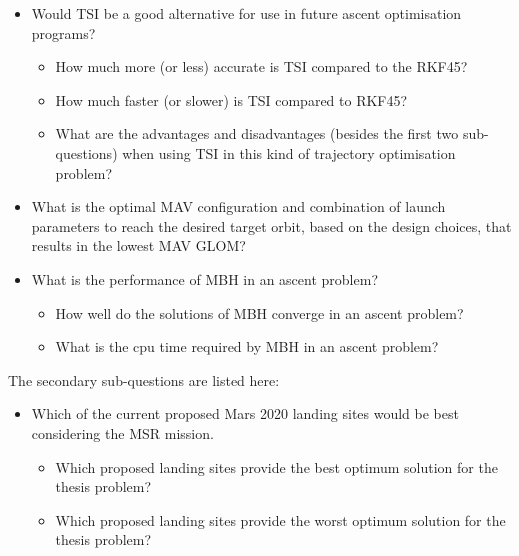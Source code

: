 \begin{itemize}
\item Would \ac{TSI} be a good alternative for use in future ascent optimisation programs?
\begin{itemize}
\item How much more (or less) accurate is \ac{TSI} compared to the \ac{RKF45}?
\item How much faster (or slower) is \ac{TSI} compared to \ac{RKF45}?
\item What are the advantages and disadvantages (besides the first two sub-questions) when using \ac{TSI} in this kind of trajectory optimisation problem?
\end{itemize}
\item What is the optimal \ac{MAV} configuration and combination of launch parameters to reach the desired target orbit, based on the design choices, that results in the lowest \ac{MAV} \ac{GLOM}?
\item What is the performance of \ac{MBH} in an ascent problem?
\begin{itemize}
\item How well do the solutions of \ac{MBH} converge in an ascent problem?
\item What is the cpu time required by \ac{MBH} in an ascent problem?
\end{itemize}
\end{itemize}

The secondary sub-questions are listed here:

\begin{itemize}
\item Which of the current proposed Mars 2020 landing sites would be best considering the \ac{MSR} mission.
\begin{itemize}
\item Which proposed landing sites provide the best optimum solution for the thesis problem?
\item Which proposed landing sites provide the worst optimum solution for the thesis problem?
\end{itemize}
\end{itemize}


